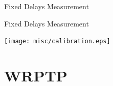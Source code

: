 \documentclass[compress,red]{beamer}
\begin{document}
\logo{}
\begin{frame}{Fixed Delays Measurement}


\end{frame}
\begin{frame}{Fixed Delays Measurement}

  \begin{center}
  \texttt{[image: misc/calibration.eps]}
  \end{center}

\end{frame}
% 
% 
% 
\section{WRPTP}
\end{document}
